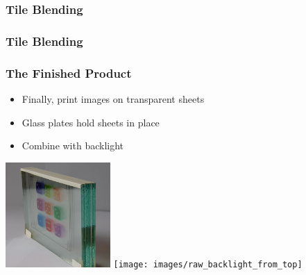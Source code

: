 \documentclass[12pt, compress]{beamer}
\begin{document}
\begin{frame}[fragile]
	\frametitle{Tile Blending}

	\begin{figure}
		
		
	\end{figure}
\end{frame}

\begin{frame}[fragile]
	\frametitle{Tile Blending}
	
	\begin{figure}
		\hspace{1cm}
	\end{figure}
\end{frame}

\begin{frame}[fragile]
	\frametitle{The Finished Product}
	
	\begin{itemize}
		\item Finally, print images on transparent sheets
		\item Glass plates hold sheets in place
		\item Combine with backlight
	\end{itemize}
	
	\begin{center}
		\includegraphics[height=4cm]{images/glass_plates_front_view_cropped}
		\hspace{1cm}
		\texttt{[image: images/raw\_backlight\_from\_top]}
	\end{center}
\end{frame}
\end{document}
